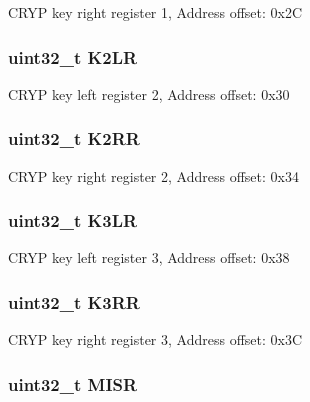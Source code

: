 C\-R\-Y\-P key right register 1, Address offset\-: 0x2\-C \hypertarget{struct_c_r_y_p___type_def_a32210fb9ecbb0b4bd127e688f3f79802}{
\subsubsection[{K2\-L\-R}]{ uint32\-\_\-t K2\-L\-R}}\label{struct_c_r_y_p___type_def_a32210fb9ecbb0b4bd127e688f3f79802}
C\-R\-Y\-P key left register 2, Address offset\-: 0x30 \hypertarget{struct_c_r_y_p___type_def_a41a0448734e8ccbdd6fba98284815c6f}{
\subsubsection[{K2\-R\-R}]{ uint32\-\_\-t K2\-R\-R}}\label{struct_c_r_y_p___type_def_a41a0448734e8ccbdd6fba98284815c6f}
C\-R\-Y\-P key right register 2, Address offset\-: 0x34 \hypertarget{struct_c_r_y_p___type_def_a516c328fcb53ec754384e584caf890f5}{
\subsubsection[{K3\-L\-R}]{ uint32\-\_\-t K3\-L\-R}}\label{struct_c_r_y_p___type_def_a516c328fcb53ec754384e584caf890f5}
C\-R\-Y\-P key left register 3, Address offset\-: 0x38 \hypertarget{struct_c_r_y_p___type_def_a8fe249258f1733ec155c3893375c7a21}{
\subsubsection[{K3\-R\-R}]{ uint32\-\_\-t K3\-R\-R}}\label{struct_c_r_y_p___type_def_a8fe249258f1733ec155c3893375c7a21}
C\-R\-Y\-P key right register 3, Address offset\-: 0x3\-C \hypertarget{struct_c_r_y_p___type_def_a524e134cec519206cb41d0545e382978}{
\subsubsection[{M\-I\-S\-R}]{ uint32\-\_\-t M\-I\-S\-R}}\label{struct_c_r_y_p___type_def_a524e134cec519206cb41d0545e382978}
